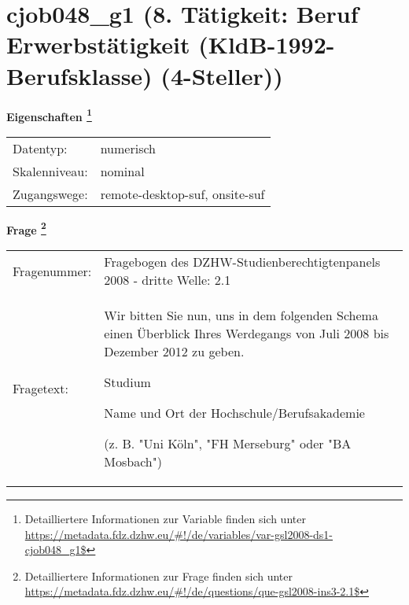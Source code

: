 
    \setcounter{footnote}{0}

    \vspace*{-1.8cm}
	\section{cjob048\_g1 (8. Tätigkeit: Beruf Erwerbstätigkeit (KldB-1992-Berufsklasse) (4-Steller))}
	\label{section:cjob048_g1}



    \vspace*{0.5cm}
    \noindent\textbf{Eigenschaften
	\footnote{Detailliertere Informationen zur Variable finden sich unter
		\url{https://metadata.fdz.dzhw.eu/\#!/de/variables/var-gsl2008-ds1-cjob048_g1$}}}\\
	\begin{tabularx}{\hsize}{@{}lX}
	Datentyp: & numerisch \\
	Skalenniveau: & nominal \\
	Zugangswege: &
	  remote-desktop-suf, 
	  onsite-suf
 \\
    \end{tabularx}



				\vspace*{0.5cm}
                \noindent\textbf{Frage
	                \footnote{Detailliertere Informationen zur Frage finden sich unter
		              \url{https://metadata.fdz.dzhw.eu/\#!/de/questions/que-gsl2008-ins3-2.1$}}}\\
				\begin{tabularx}{\hsize}{@{}lX}
					Fragenummer: &
					  Fragebogen des DZHW-Studienberechtigtenpanels 2008 - dritte Welle:
					  2.1
 \\
					Fragetext: & Wir bitten Sie nun, uns in dem folgenden Schema einen Überblick Ihres Werdegangs von Juli 2008 bis Dezember 2012 zu geben.\par  Studium\par  Name und Ort der Hochschule/Berufsakademie\par  (z. B. "Uni Köln", "FH Merseburg" oder "BA Mosbach") \\
				\end{tabularx}





